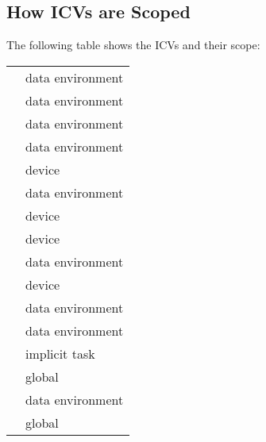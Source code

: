 







\vspace{-1.0\baselineskip}
\subsection{How ICVs are Scoped}
\label{subsec:How ICVs are Scoped}
The following table shows the ICVs and their scope:

\renewcommand{\arraystretch}{1.3}
\tablelasttail{\hline}
\begin{supertabular}{p{1.5in} p{2.5in}}
 & data environment\\
 & data environment\\
 & data environment\\
 & data environment\\
 & device\\
 & data environment\\
 & device\\
 & device\\
 & data environment\\
 & device\\
 & data environment\\
 & data environment\\
 & implicit task\\
 & global\\
 & data environment\\
 & global\\
\end{supertabular}
\renewcommand{\arraystretch}{1.5} %

